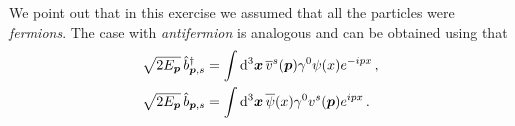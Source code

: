 \begin{sol}
    We point out that in this exercise we assumed that all the particles were \emph{fermions}. The case with \emph{antifermion} is analogous and can be obtained using that
        \begin{equation}
        \begin{split}
            \sqrt{2 E_{\boldsymbol{p}}} \, \hat{b}^\dagger_{\boldsymbol{p}, s} & = \int {\rm d}^3 \boldsymbol{x} \, \overline{v}^s(\boldsymbol{p})  \gamma^0 \psi(x) e^{-ipx} \,, \\
            \sqrt{2 E_{\boldsymbol{p}}} \, \hat{b}_{\boldsymbol{p}, s} & = \int {\rm d}^3 \boldsymbol{x} \, \overline{\psi}(x) \gamma^0 v^s(\boldsymbol{p}) e^{ipx} \,.
        \end{split}
    \end{equation}
\end{sol}